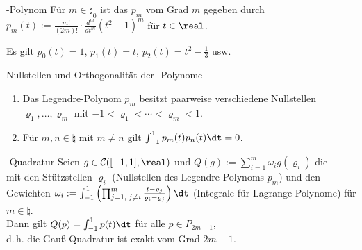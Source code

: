 \linie
\pagebreak

\begin{Def}{-Polynom}
    Für $m \in \natural_0$ ist das  $p_m$
    vom Grad $m$ gegeben durch
    $p_m(t) := \frac{m!}{(2m)!} \cdot \frac{d^m}{dt^m} (t^2 - 1)^m$
    für $t \in \real$.
\end{Def}

\begin{Bsp}
    Es gilt $p_0(t) = 1$,
    $p_1(t) = t$,
    $p_2(t) = t^2 - \frac{1}{3}$ usw.
\end{Bsp}

\begin{Lemma}{Nullstellen und Orthogonalität der -Polynome}
    \begin{enumerate}
        \item
        Das Legendre-Polynom $p_m$ besitzt paarweise verschiedene Nullstellen\\
        $\varrho_1, \dotsc, \varrho_m$ mit
        $-1 < \varrho_1 < \dotsb < \varrho_m < 1$.
        
        \item
        Für $m, n \in \natural$ mit $m \not= n$ gilt
        $\int_{-1}^1 p_m(t) p_n(t) \dt = 0$.
    \end{enumerate}
\end{Lemma}

\begin{Satz}{-Quadratur}
    Seien $g \in \C([-1, 1], \real)$ und
    $Q(g) := \sum_{i=1}^m \omega_i g(\varrho_i)$
    die\\
     mit
    den Stützstellen $\varrho_i$ (Nullstellen des Legendre-Polynoms $p_m$)
    und den Gewichten $\omega_i := \int_{-1}^1 \left(\prod_{j=1,\;j\not=i}^m
    \frac{t - \varrho_j}{\varrho_i - \varrho_j}\right) \dt$
    (Integrale für Lagrange-Polynome) für $m \in \natural$.\\
    Dann gilt $Q(p) = \int_{-1}^1 p(t)\dt$ für alle $p \in P_{2m-1}$,\\
    d.\,h. die Gauß-Quadratur ist exakt vom Grad $2m - 1$.
\end{Satz}

\linie

